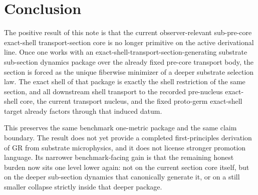\documentclass[11pt]{article}
\begin{document}
\section{Conclusion}

The positive result of this note is that the current observer-relevant sub-pre-core exact-shell transport-section core is no longer primitive on the active derivational line. Once one works with an exact-shell-transport-section-generating substrate sub-section dynamics package over the already fixed pre-core transport body, the section is forced as the unique fiberwise minimizer of a deeper substrate selection law. The exact shell of that package is exactly the shell restriction of the same section, and all downstream shell transport to the recorded pre-nucleus exact-shell core, the current transport nucleus, and the fixed proto-germ exact-shell target already factors through that induced datum.

This preserves the same benchmark one-metric package and the same claim boundary. The result does not yet provide a completed first-principles derivation of GR from substrate microphysics, and it does not license stronger promotion language. Its narrower benchmark-facing gain is that the remaining honest burden now sits one level lower again: not on the current section core itself, but on the deeper sub-section dynamics that canonically generate it, or on a still smaller collapse strictly inside that deeper package.
\end{document}
